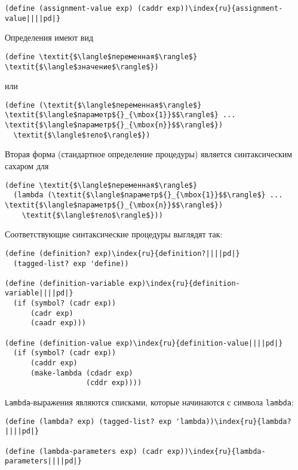 \begin{plainlist}
\begin{Verbatim}[fontsize=\small]
(define (assignment-value exp) (caddr exp))\index{ru}{assignment-value||||pd|}
\end{Verbatim}

\item
Определения имеют вид

\begin{Verbatim}[fontsize=\small]
(define \textit{$\langle$переменная$\rangle$} \textit{$\langle$значение$\rangle$})
\end{Verbatim}
или

\begin{Verbatim}[fontsize=\small]
(define (\textit{$\langle$переменная$\rangle$} \textit{$\langle$параметр${}_{\mbox{1}}$$\rangle$} ... \textit{$\langle$параметр${}_{\mbox{n}}$$\rangle$})
  \textit{$\langle$тело$\rangle$})
\end{Verbatim}
Вторая форма (стандартное определение процедуры) является
синтаксическим сахаром 
для

\begin{Verbatim}[fontsize=\small]
(define \textit{$\langle$переменная$\rangle$}
  (lambda (\textit{$\langle$параметр${}_{\mbox{1}}$$\rangle$} ... \textit{$\langle$параметр${}_{\mbox{n}}$$\rangle$})
    \textit{$\langle$тело$\rangle$}))
\end{Verbatim}
Соответствующие синтаксические процедуры выглядят так:

\begin{Verbatim}[fontsize=\small]
(define (definition? exp)\index{ru}{definition?||||pd|}
  (tagged-list? exp 'define))

(define (definition-variable exp)\index{ru}{definition-variable||||pd|}
  (if (symbol? (cadr exp))
      (cadr exp)
      (caadr exp)))

(define (definition-value exp)\index{ru}{definition-value||||pd|}
  (if (symbol? (cadr exp))
      (caddr exp)
      (make-lambda (cdadr exp)
                   (cddr exp))))
\end{Verbatim}

\item
{\tt Lambda}-выражения являются списками,
которые начинаются с символа {\tt lambda}:

\begin{Verbatim}[fontsize=\small]
(define (lambda? exp) (tagged-list? exp 'lambda))\index{ru}{lambda?||||pd|}

(define (lambda-parameters exp) (cadr exp))\index{ru}{lambda-parameters||||pd|}


\end{Verbatim}
\end{plainlist}
